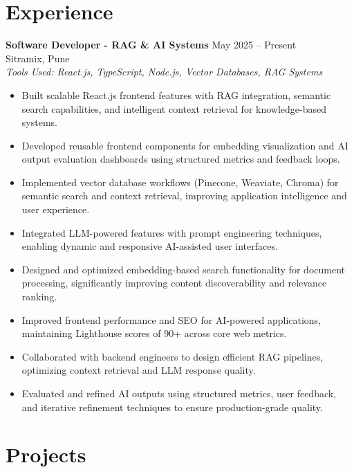 \documentclass[a4paper,10pt]{article}
\begin{document}
    \section*{Experience}

    \textbf{Software Developer - RAG \& AI Systems} \hfill May 2025 -- Present\\
    Sitramix, Pune\\
    \textit{Tools Used: React.js, TypeScript, Node.js, Vector Databases, RAG Systems}

    
\begin{itemize}[leftmargin=*]
    \item Built scalable React.js frontend features with RAG integration, semantic search capabilities, and intelligent context retrieval for knowledge-based systems.
    
    \item Developed reusable frontend components for embedding visualization and AI output evaluation dashboards using structured metrics and feedback loops.
    
    \item Implemented vector database workflows (Pinecone, Weaviate, Chroma) for semantic search and context retrieval, improving application intelligence and user experience.
    
    \item Integrated LLM-powered features with prompt engineering techniques, enabling dynamic and responsive AI-assisted user interfaces.
    
    \item Designed and optimized embedding-based search functionality for document processing, significantly improving content discoverability and relevance ranking.
    
    \item Improved frontend performance and SEO for AI-powered applications, maintaining Lighthouse scores of 90+ across core web metrics.
    
    \item Collaborated with backend engineers to design efficient RAG pipelines, optimizing context retrieval and LLM response quality.
    
    \item Evaluated and refined AI outputs using structured metrics, user feedback, and iterative refinement techniques to ensure production-grade quality.
\end{itemize}


    \section*{Projects}
\end{document}
